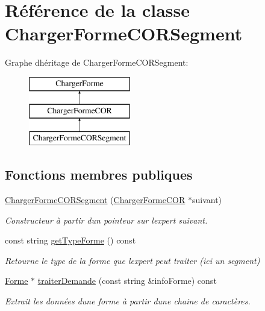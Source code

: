 \hypertarget{class_charger_forme_c_o_r_segment}{}\section{Référence de la classe Charger\+Forme\+C\+O\+R\+Segment}
\label{class_charger_forme_c_o_r_segment}
Graphe d\textquotesingle{}héritage de Charger\+Forme\+C\+O\+R\+Segment\+:\begin{figure}[H]
\begin{center}
\leavevmode
\includegraphics[height=3.000000cm]{class_charger_forme_c_o_r_segment}
\end{center}
\end{figure}
\subsection*{Fonctions membres publiques}
\begin{DoxyCompactItemize}
\item 
\mbox{\hyperlink{class_charger_forme_c_o_r_segment_ac3a9caaf7fc8e03678cca2161513a1f4}{Charger\+Forme\+C\+O\+R\+Segment}} (\mbox{\hyperlink{class_charger_forme_c_o_r}{Charger\+Forme\+C\+OR}} $\ast$suivant)
\begin{DoxyCompactList}\small\item\em Constructeur à partir d\textquotesingle{}un pointeur sur l\textquotesingle{}expert suivant. \end{DoxyCompactList}\item 
const string \mbox{\hyperlink{class_charger_forme_c_o_r_segment_a88fc3dc3d1e4fb196246f5105965e285}{get\+Type\+Forme}} () const
\begin{DoxyCompactList}\small\item\em Retourne le type de la forme que l\textquotesingle{}expert peut traiter (ici un segment) \end{DoxyCompactList}\item 
\mbox{\hyperlink{class_forme}{Forme}} $\ast$ \mbox{\hyperlink{class_charger_forme_c_o_r_segment_ac7998f4a2669a3f88dc0b204af187780}{traiter\+Demande}} (const string \&info\+Forme) const
\begin{DoxyCompactList}\small\item\em Extrait les données d\textquotesingle{}une forme à partir d\textquotesingle{}une chaine de caractères. \end{DoxyCompactList}\end{DoxyCompactItemize}
